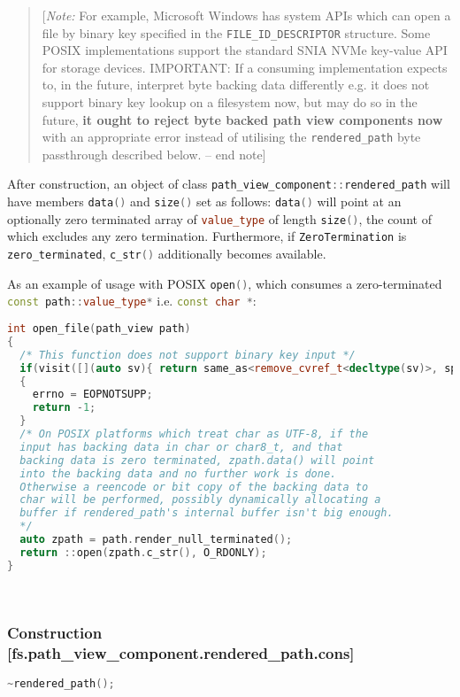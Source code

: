 \documentclass[11pt]{article}
\newcommand{\code}[2][cpp]{\lstinline[language=#1,basicstyle=\small\ttfamily]{#2}}
\newcommand{\note}[1]{\begin{quote}[\textit{Note:} #1 -- end note]\end{quote}}
\begin{document}
\note{For example, Microsoft Windows has system APIs which can open a file by binary key specified in the \code{FILE_ID_DESCRIPTOR} structure. Some POSIX implementations support the standard SNIA NVMe key-value API for storage devices. IMPORTANT: If a consuming implementation expects to, in the future, interpret byte backing data differently e.g. it does not support binary key lookup on a filesystem now, but may do so in the future, \textbf{it ought to reject byte backed path view components now} with an appropriate error instead of utilising the \code{rendered_path} byte passthrough described below.}

After construction, an object of class \code{path_view_component::rendered_path} will have members \code{data()} and \code{size()} set as follows: \code{data()} will point at an optionally zero terminated array of \code{value_type} of length \code{size()}, the count of which excludes any zero termination. Furthermore, if \code{ZeroTermination} is \code{zero_terminated}, \code{c_str()} additionally becomes available.

As an example of usage with POSIX \code{open()}, which consumes a zero-terminated \code{const path::value_type*} i.e. \code{const char *}:

\begin{lstlisting}[language=cpp]
int open_file(path_view path)
{
  /* This function does not support binary key input */
  if(visit([](auto sv){ return same_as<remove_cvref_t<decltype(sv)>, span<const byte>>; }, path))
  {
    errno = EOPNOTSUPP;
    return -1;
  }
  /* On POSIX platforms which treat char as UTF-8, if the
  input has backing data in char or char8_t, and that
  backing data is zero terminated, zpath.data() will point
  into the backing data and no further work is done.
  Otherwise a reencode or bit copy of the backing data to
  char will be performed, possibly dynamically allocating a
  buffer if rendered_path's internal buffer isn't big enough.
  */
  auto zpath = path.render_null_terminated();
  return ::open(zpath.c_str(), O_RDONLY);
}
\end{lstlisting}

~ \\

\subsubsection*{Construction [fs.path\_view\_component.rendered\_path.cons]}

\begin{lstlisting}[language=cpp]
    ~rendered_path();
\end{lstlisting}
\end{document}
